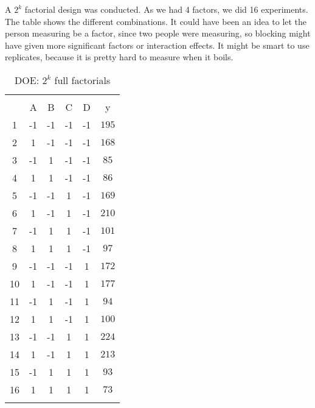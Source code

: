 A $2^k$ factorial design was conducted. As we had 4 factors, we did 16 experiments. The table shows the different combinations. It could have been an idea to let the person measuring be a factor, since two people were measuring, so blocking might have given more significant factors or interaction effects. It might be smart to use replicates, because it is pretty hard to measure when it boils.

\begin{table}[H] \centering 
  \caption{DOE: $2^k$ full factorials} 
  \label{DOEtable} 
\begin{tabular}{@{\extracolsep{5pt}} cccccc} 
\\[-1.8ex]\hline 
\hline \\[-1.8ex] 
 & A & B & C & D & y \\ 
1 & -1 & -1 & -1 & -1 & $195$ \\ 
2 & 1 & -1 & -1 & -1 & $168$ \\ 
3 & -1 & 1 & -1 & -1 & $85$ \\ 
4 & 1 & 1 & -1 & -1 & $86$ \\ 
5 & -1 & -1 & 1 & -1 & $169$ \\ 
6 & 1 & -1 & 1 & -1 & $210$ \\ 
7 & -1 & 1 & 1 & -1 & $101$ \\ 
8 & 1 & 1 & 1 & -1 & $97$ \\ 
9 & -1 & -1 & -1 & 1 & $172$ \\ 
10 & 1 & -1 & -1 & 1 & $177$ \\ 
11 & -1 & 1 & -1 & 1 & $94$ \\ 
12 & 1 & 1 & -1 & 1 & $100$ \\ 
13 & -1 & -1 & 1 & 1 & $224$ \\ 
14 & 1 & -1 & 1 & 1 & $213$ \\ 
15 & -1 & 1 & 1 & 1 & $93$ \\
16 & 1 & 1 & 1 & 1 & $73$ \\
\hline \\[-1.8ex] 
\end{tabular} 
\end{table} 